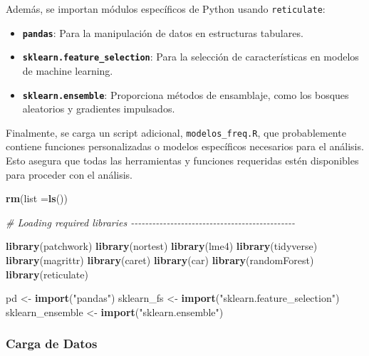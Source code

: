 \documentclass[
  12pt,
]{book}
\newenvironment{Shaded}{\begin{snugshade}}{\end{snugshade}}
\newcommand{\AttributeTok}[1]{\textcolor[rgb]{0.13,0.29,0.53}{#1}}
\newcommand{\CommentTok}[1]{\textcolor[rgb]{0.56,0.35,0.01}{\textit{#1}}}
\newcommand{\FunctionTok}[1]{\textcolor[rgb]{0.13,0.29,0.53}{\textbf{#1}}}
\newcommand{\NormalTok}[1]{#1}
\newcommand{\OtherTok}[1]{\textcolor[rgb]{0.56,0.35,0.01}{#1}}
\newcommand{\StringTok}[1]{\textcolor[rgb]{0.31,0.60,0.02}{#1}}
\providecommand{\tightlist}{%
  \setlength{\itemsep}{0pt}\setlength{\parskip}{0pt}}
\begin{document}
Además, se importan módulos específicos de Python usando \texttt{reticulate}:

\begin{itemize}
\tightlist
\item
  \textbf{\texttt{pandas}}: Para la manipulación de datos en estructuras tabulares.
\item
  \textbf{\texttt{sklearn.feature\_selection}}: Para la selección de características en modelos de machine learning.
\item
  \textbf{\texttt{sklearn.ensemble}}: Proporciona métodos de ensamblaje, como los bosques aleatorios y gradientes impulsados.
\end{itemize}

Finalmente, se carga un script adicional, \texttt{modelos\_freq.R}, que probablemente contiene funciones personalizadas o modelos específicos necesarios para el análisis. Esto asegura que todas las herramientas y funciones requeridas estén disponibles para proceder con el análisis.

\begin{Shaded}
\begin{Highlighting}[]
\FunctionTok{rm}\NormalTok{(}\AttributeTok{list =}\FunctionTok{ls}\NormalTok{())}

\CommentTok{\# Loading required libraries {-}{-}{-}{-}{-}{-}{-}{-}{-}{-}{-}{-}{-}{-}{-}{-}{-}{-}{-}{-}{-}{-}{-}{-}{-}{-}{-}{-}{-}{-}{-}{-}{-}{-}{-}{-}{-}{-}{-}{-}{-}{-}{-}{-}{-}{-}}

\FunctionTok{library}\NormalTok{(patchwork)}
\FunctionTok{library}\NormalTok{(nortest)}
\FunctionTok{library}\NormalTok{(lme4)}
\FunctionTok{library}\NormalTok{(tidyverse)}
\FunctionTok{library}\NormalTok{(magrittr)}
\FunctionTok{library}\NormalTok{(caret)}
\FunctionTok{library}\NormalTok{(car)}
\FunctionTok{library}\NormalTok{(randomForest)}
\FunctionTok{library}\NormalTok{(reticulate)}

\NormalTok{pd }\OtherTok{\textless{}{-}} \FunctionTok{import}\NormalTok{(}\StringTok{"pandas"}\NormalTok{)}
\NormalTok{sklearn\_fs }\OtherTok{\textless{}{-}} \FunctionTok{import}\NormalTok{(}\StringTok{"sklearn.feature\_selection"}\NormalTok{)}
\NormalTok{sklearn\_ensemble }\OtherTok{\textless{}{-}} \FunctionTok{import}\NormalTok{(}\StringTok{"sklearn.ensemble"}\NormalTok{)}
\end{Highlighting}
\end{Shaded}

\hypertarget{carga-de-datos-2}{%
\subsubsection*{Carga de Datos}\label{carga-de-datos-2}}
\end{document}
